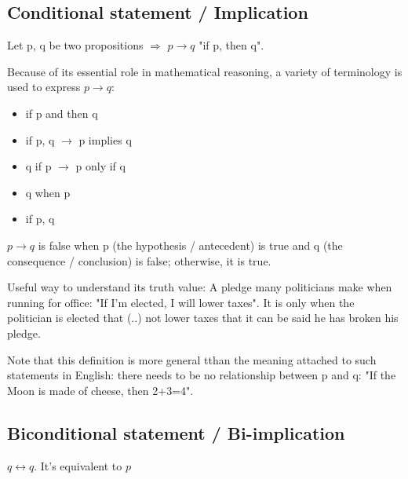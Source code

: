 \documentclass[12pt, a4paper]{book}
\begin{document}
\subsection*{Conditional statement / Implication}

Let p, q be two propositions $\Rightarrow$ $p \rightarrow q $ "if p, then q".

Because of its essential role in mathematical reasoning, a variety of terminology is used to express $p \rightarrow q$:

\begin{itemize}
    \item if p and then q
    \item if p, q $\rightarrow$ p implies q
    \item q if p $\rightarrow$ p only if q
    \item q when p
    \item if p, q
\end{itemize}

$p \rightarrow q$ is false when p (the hypothesis / antecedent) is true and q (the consequence / conclusion) is false; otherwise, it is true.

Useful way to understand its truth value: A pledge many politicians make when running for office: "If I'm elected, I will lower taxes".
It is only when the politician is elected that (..) not lower taxes that it can be said he has broken his pledge.

\begin{rem}
    Note that this definition is more general tthan the meaning attached to such statements in English: there needs to be no relationship between p and q: "If the Moon is made of cheese, then 2+3=4".
\end{rem}

\subsection*{Biconditional statement / Bi-implication}

$q \leftrightarrow q$. It's equivalent to $p$
\end{document}
